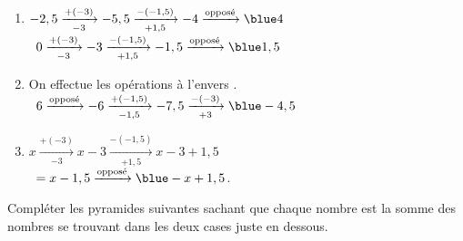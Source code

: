 \begin{colonne*exercice}
\begin{corrige}
   \ \\ [-5mm]
   \begin{enumerate}
      \item $-2,5 \xrightarrow[-3]{+(-3)} -5,5 \xrightarrow[+1,5]{-(-1,5)} -4 \xrightarrow{\text{opposé}} {\blue 4}$ \\ [1mm]
         \quad\, $0 \xrightarrow[-3]{+(-3)} -3 \xrightarrow[+1,5]{-(-1,5)} -1,5 \xrightarrow{\text{opposé}} {\blue 1,5}$ \\ [1mm]
      \item On effectue les opérations \og à l'envers \fg. \\ [1mm]
         \quad\, $6 \xrightarrow{\text{opposé}} -6 \xrightarrow[-1,5]{+(-1,5)} -7,5  \xrightarrow[+3]{-(-3)}{\blue -4,5}$ \\ [1mm]
      \item $x \xrightarrow[-3]{+(-3)} x-3 \xrightarrow[+1,5]{-(-1,5)} x-3+1,5$ \\
         \quad\, $=x-1,5 \xrightarrow{\text{opposé}}{\blue -x+1,5}$. \\ [1mm]
   \end{enumerate}
\end{corrige}

\medskip


\begin{exercice} %
   Compléter les pyramides suivantes sachant que chaque nombre est la somme des nombres se trouvant dans les deux cases juste en dessous. \\ [2mm]
   \;
   \ \\
   \;
\end{exercice}


\end{colonne*exercice}
